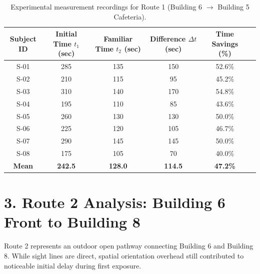 \documentclass[11pt, a4paper]{article}
\begin{document}
\begin{table}[h!]
\centering
\small
\begin{tabular}{cccccc}
\toprule
\textbf{Subject ID} & \textbf{Initial Time $t_1$ (sec)} & \textbf{Familiar Time $t_2$ (sec)} & \textbf{Difference $\Delta t$ (sec)} & \textbf{Time Savings (\%)} \\
\midrule
S-01 & 285 & 135 & 150 & 52.6\% \\
S-02 & 210 & 115 & 95  & 45.2\% \\
S-03 & 310 & 140 & 170 & 54.8\% \\
S-04 & 195 & 110 & 85  & 43.6\% \\
S-05 & 260 & 130 & 130 & 50.0\% \\
S-06 & 225 & 120 & 105 & 46.7\% \\
S-07 & 290 & 145 & 145 & 50.0\% \\
S-08 & 175 & 105 & 70  & 40.0\% \\
\midrule
\textbf{Mean} & \textbf{242.5} & \textbf{128.0} & \textbf{114.5} & \textbf{47.2\%} \\
\bottomrule
\end{tabular}
\caption{Experimental measurement recordings for Route 1 (Building 6 $\rightarrow$ Building 5 Cafeteria).}
\end{table}

\newpage


\section*{3. Route 2 Analysis: Building 6 Front to Building 8}

Route 2 represents an outdoor open pathway connecting Building 6 and Building 8. While sight lines are direct, spatial orientation overhead still contributed to noticeable initial delay during first exposure.

\vspace{0.5em}
\end{document}
